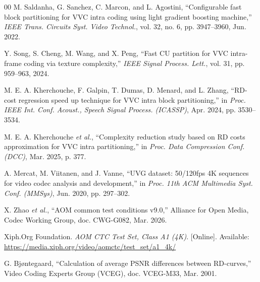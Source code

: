 \documentclass[conference]{IEEEtran}
\begin{document}
\begin{thebibliography}{00}
 M. Saldanha, G. Sanchez, C. Marcon, and L. Agostini, ``Configurable fast block partitioning for VVC intra coding using light gradient boosting machine,'' \emph{IEEE Trans. Circuits Syst. Video Technol.}, vol. 32, no. 6, pp. 3947--3960, Jun. 2022.

 Y. Song, S. Cheng, M. Wang, and X. Peng, ``Fast CU partition for VVC intra-frame coding via texture complexity,'' \emph{IEEE Signal Process. Lett.}, vol. 31, pp. 959--963, 2024.

 M. E. A. Kherchouche, F. Galpin, T. Dumas, D. Menard, and L. Zhang, ``RD-cost regression speed up technique for VVC intra block partitioning,'' in \emph{Proc. IEEE Int. Conf. Acoust., Speech Signal Process. (ICASSP)}, Apr. 2024, pp. 3530--3534.

 M. E. A. Kherchouche \emph{et al.}, ``Complexity reduction study based on RD costs approximation for VVC intra partitioning,'' in \emph{Proc. Data Compression Conf. (DCC)}, Mar. 2025, p. 377.

 A. Mercat, M. Viitanen, and J. Vanne, ``UVG dataset: 50/120fps 4K sequences for video codec analysis and development,'' in \emph{Proc. 11th ACM Multimedia Syst. Conf. (MMSys)}, Jun. 2020, pp. 297--302.

 X. Zhao \emph{et al.}, ``AOM common test conditions v9.0,'' Alliance for Open Media, Codec Working Group, doc. CWG-G082, Mar. 2026.

 Xiph.Org Foundation. \emph{AOM CTC Test Set, Class A1 (4K)}. [Online]. Available: \url{https://media.xiph.org/video/aomctc/test_set/a1_4k/}

 G. Bj{\o}ntegaard, ``Calculation of average PSNR differences between RD-curves,'' Video Coding Experts Group (VCEG), doc. VCEG-M33, Mar. 2001.

\end{thebibliography}
\end{document}
